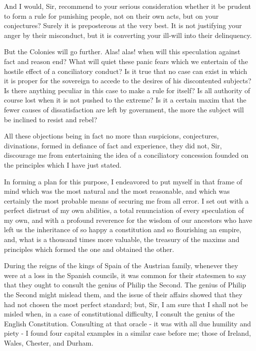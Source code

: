 And I would, Sir, recommend to your serious consideration whether it be prudent to form a rule for punishing people, not on their own acts, but on your conjectures? Surely it is preposterous at the very best. It is not justifying your anger by their misconduct, but it is converting your ill-will into their delinquency.\par

But the Colonies will go further. Alas! alas! when will this speculation against fact and reason end? What will quiet these panic fears which we entertain of the hostile effect of a conciliatory conduct? Is it true that no case can exist in which it is proper for the sovereign to accede to the desires of his discontented subjects? Is there anything peculiar in this case to make a rule for itself? Is all authority of course lost when it is not pushed to the extreme? Is it a certain maxim that the fewer causes of dissatisfaction are left by government, the more the subject will be inclined to resist and rebel?\par

All these objections being in fact no more than suspicions, conjectures, divinations, formed in defiance of fact and experience, they did not, Sir, discourage me from entertaining the idea of a conciliatory concession founded on the principles which I have just stated.\par

In forming a plan for this purpose, I endeavored to put myself in that frame of mind which was the most natural and the most reasonable, and which was certainly the most probable means of securing me from all error. I set out with a perfect distrust of my own abilities, a total renunciation of every speculation of my own, and with a profound reverence for the wisdom of our ancestors who have left us the inheritance of so happy a constitution and so flourishing an empire, and, what is a thousand times more valuable, the treasury of the maxims and principles which formed the one and obtained the other.\par

During the reigns of the kings of Spain of the Austrian family, whenever they were at a loss in the Spanish councils, it was common for their statesmen to say that they ought to consult the genius of Philip the Second. The genius of Philip the Second might mislead them, and the issue of their affairs showed that they had not chosen the most perfect standard; but, Sir, I am sure that I shall not be misled when, in a case of constitutional difficulty, I consult the genius of the English Constitution. Consulting at that oracle - it was with all due humility and piety - I found four capital examples in a similar case before me; those of Ireland, Wales, Chester, and Durham.\par

